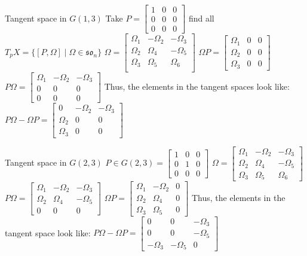 \documentclass[11pt,a4paper]{report}
\begin{document}
\begin{Ex}{ Tangent space in $G(1,3)$}
   Take $P = \begin{bmatrix} 1 & 0 & 0 \\ 0 & 0 & 0 \\ 0 & 0 & 0 \end{bmatrix} $
   find all $T_p X = \{ [P,\Omega] \; | \; \Omega \in \mathfrak{so}_n \}$
   $\Omega = \begin{bmatrix} \Omega_1 & -\Omega_2 & -\Omega_3 \\
                             \Omega_2 & \Omega_4 & -\Omega_5 \\
                             \Omega_3 & \Omega_5 & \Omega_6 \\ \end{bmatrix} $
    $\Omega P = \begin{bmatrix} \Omega_1 & 0 & 0 \\ \Omega_2 & 0 & 0 \\ \Omega_3 & 0 & 0 \end{bmatrix}$
    $ P \Omega = \begin{bmatrix} \Omega_1 & -\Omega_2 & - \Omega_3 \\ 0 & 0 & 0 \\ 0 & 0 & 0 \end{bmatrix} $
    Thus, the elements in the tangent spaces look like:
    $ P \Omega - \Omega P  = \begin{bmatrix} 0 & - \Omega_2 & - \Omega_3 \\ \Omega_2 & 0 & 0 \\ \Omega_3 & 0 & 0  \end{bmatrix}$
\end{Ex}
\begin{Ex}{Tangent space in $G(2,3)$}
   $P \in G(2,3) = \begin{bmatrix} 1 & 0 & 0 \\ 0 & 1 & 0 \\ 0 & 0 & 0  \end{bmatrix} $
   $ \Omega = \begin{bmatrix} \Omega_1 & -\Omega_2 & -\Omega_3 \\ \Omega_2 & \Omega_4 & -\Omega_5 \\ \Omega_3 & \Omega_5 & \Omega_6 \end{bmatrix}$
   $ P \Omega = \begin{bmatrix} \Omega_1 & - \Omega_2 & - \Omega_3 \\ \Omega_2 & \Omega_4 & - \Omega_5 \\ 0 & 0 & 0 \end{bmatrix}$
   $ \Omega P = \begin{bmatrix} \Omega_1 & - \Omega_2 & 0 \\ \Omega_2 & \Omega_4 & 0 \\ \Omega_3 & \Omega_5 & 0 \end{bmatrix}$
   Thus, the elements in the tangent space look like:
   $P \Omega - \Omega P = \begin{bmatrix} 0 & 0 & -\Omega_3 \\ 0 & 0 & -\Omega_5 \\ -\Omega_3 & - \Omega_5 & 0 \end{bmatrix} $
\end{Ex}
\end{document}
